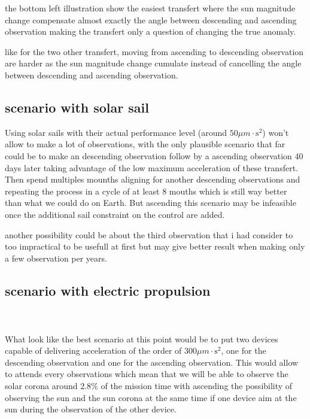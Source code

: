 \documentclass[11pt]{article} %
\begin{document}
			the bottom left illustration show the easiest transfert where the sun magnitude change compensate almost exactly the angle between descending and ascending observation making the transfert only a question of changing the true anomaly.
			
			like for the two other transfert, moving from ascending to descending observation are harder as the sun magnitude change cumulate instead of cancelling the angle between descending and ascending observation. 
			
			
			
			\subsection{scenario with solar sail}
			
			Using solar sails with their actual performance level (around $50\mu{m}\cdot\text{s}^2$) won't allow to make a lot of observations, with the only plausible scenario that far could be to make an descending observation follow by a ascending observation 40 days later taking advantage of the low maximum acceleration of these transfert. Then spend multiples mounths aligning for another descending observations and repeating the process in a cycle of at least 8 mouths which is still way better than what we could do on Earth. But ascending this scenario may be infeasible once the additional sail constraint on the control are added.
			
			another possibility could be about the third observation that i had consider to too impractical to be usefull at first but may give better result when making only a few observation per years.
			
			\subsection{scenario with electric propulsion}	
			\\ \\
			What look like the best scenario at this point would be to put two devices capable of delivering acceleration of the order of $300\mu{m}\cdot\text{s}^2$, one for the descending observation and one for the ascending observation. This would allow to attends every observations which mean that we will be able to observe the solar corona around $2.8\%$ of the mission time with ascending the possibility of observing the sun and the sun corona at the same time if one device aim at the sun during the observation of the other device.
			
\end{document}
